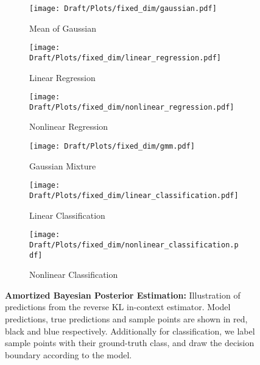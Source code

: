 \begin{figure*}
     \centering
     \captionsetup[subfigure]{font=tiny}
     \begin{subfigure}[b]{0.16\textwidth}
         \centering
         \texttt{[image: Draft/Plots/fixed\_dim/gaussian.pdf]}
         \caption*{Mean of Gaussian}
         \label{fig:gaussian}
     \end{subfigure}
     \hfill
     \begin{subfigure}[b]{0.16\textwidth}
         \centering
         \texttt{[image: Draft/Plots/fixed\_dim/linear\_regression.pdf]}
         \caption*{Linear Regression}
         \label{fig:linear_regression}
     \end{subfigure}
     \hfill
     \begin{subfigure}[b]{0.16\textwidth}
         \centering
         \texttt{[image: Draft/Plots/fixed\_dim/nonlinear\_regression.pdf]}
         \caption*{Nonlinear Regression}
         \label{nonlinear_regression}
     \end{subfigure}
     \hfill
     \begin{subfigure}[b]{0.16\textwidth}
         \centering
         \texttt{[image: Draft/Plots/fixed\_dim/gmm.pdf]}
         \caption*{Gaussian Mixture}
         \label{fig:gmm}
     \end{subfigure}
     \hfill
     \begin{subfigure}[b]{0.16\textwidth}
         \centering
         \texttt{[image: Draft/Plots/fixed\_dim/linear\_classification.pdf]}
         \caption*{Linear Classification}
         \label{fig:linear_classification}
     \end{subfigure}
     \hfill
     \begin{subfigure}[b]{0.16\textwidth}
         \centering
         \texttt{[image: Draft/Plots/fixed\_dim/nonlinear\_classification.pdf]}
         \caption*{Nonlinear Classification}
         \label{fig:nonlinear_classification}
     \end{subfigure}
    \vspace{-4mm}
    \caption{\textbf{Amortized Bayesian Posterior Estimation:} Illustration of predictions from the reverse KL in-context estimator. Model predictions, true predictions and sample points are shown in red, black and blue respectively. Additionally for classification, we label sample points with their ground-truth class, and draw the decision boundary according to the model.}
    \vspace{-6mm}
    \label{fig:fixed_dim}
\end{figure*}
